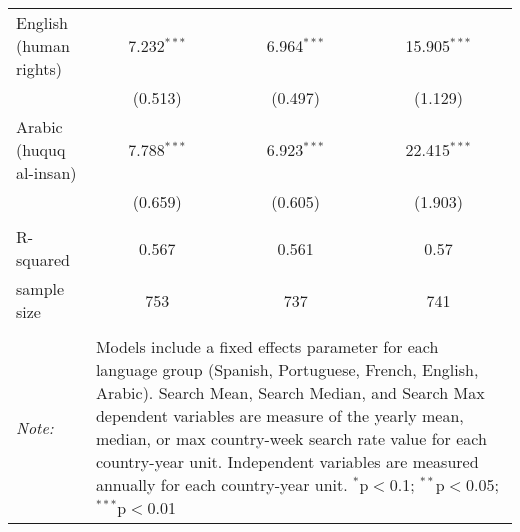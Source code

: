 \begin{table}[!htbp]
\begin{tabular}{@{\extracolsep{5pt}}lccc}
  English (human rights) & 7.232$^{***}$ & 6.964$^{***}$ & 15.905$^{***}$ \\ 
  & (0.513) & (0.497) & (1.129) \\ 
  Arabic (huquq al-insan) & 7.788$^{***}$ & 6.923$^{***}$ & 22.415$^{***}$ \\ 
  & (0.659) & (0.605) & (1.903) \\ 
 \hline \\[-1.8ex] 
R-squared  & 0.567 & 0.561 & 0.57 \\ 
sample size  & 753 & 737 & 741 \\ 
\hline 
\hline \\[-1.8ex] 
\textit{Note:}  & \multicolumn{3}{l}{\parbox[t]{8cm}{Models include a fixed effects parameter for each language group (Spanish, Portuguese, French, English, Arabic). Search Mean, Search Median, and Search Max dependent variables are measure of the yearly mean, median, or max country-week search rate value for each country-year unit. Independent variables are measured annually for each country-year unit. $^{*}$p$<$0.1; $^{**}$p$<$0.05; $^{***}$p$<$0.01}} \\ 
\end{tabular} 
\end{table} 
